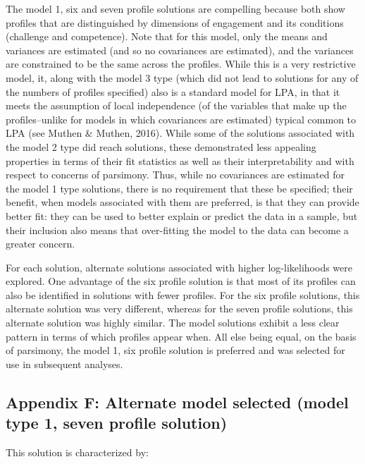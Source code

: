 \documentclass[]{msu-thesis}
\theoremstyle{definition}
\theoremstyle{definition}
\theoremstyle{definition}
\theoremstyle{remark}
\begin{document}
The model 1, six and seven profile solutions are compelling because both
show profiles that are distinguished by dimensions of engagement and its
conditions (challenge and competence). Note that for this model, only
the means and variances are estimated (and so no covariances are
estimated), and the variances are constrained to be the same across the
profiles. While this is a very restrictive model, it, along with the
model 3 type (which did not lead to solutions for any of the numbers of
profiles specified) also is a standard model for LPA, in that it meets
the assumption of local independence (of the variables that make up the
profiles--unlike for models in which covariances are estimated) typical
common to LPA (see Muthen \& Muthen, 2016). While some of the solutions
associated with the model 2 type did reach solutions, these demonstrated
less appealing properties in terms of their fit statistics as well as
their interpretability and with respect to concerns of parsimony. Thus,
while no covariances are estimated for the model 1 type solutions, there
is no requirement that these be specified; their benefit, when models
associated with them are preferred, is that they can provide better fit:
they can be used to better explain or predict the data in a sample, but
their inclusion also means that over-fitting the model to the data can
become a greater concern.

For each solution, alternate solutions associated with higher
log-likelihoods were explored. One advantage of the six profile solution
is that most of its profiles can also be identified in solutions with
fewer profiles. For the six profile solutions, this alternate solution
was very different, whereas for the seven profile solutions, this
alternate solution was highly similar. The model solutions exhibit a
less clear pattern in terms of which profiles appear when. All else
being equal, on the basis of parsimony, the model 1, six profile
solution is preferred and was selected for use in subsequent analyses.

\subsection{Appendix F: Alternate model selected (model type 1, seven
profile
solution)}\label{appendix-f-alternate-model-selected-model-type-1-seven-profile-solution}

This solution is characterized by:
\end{document}
